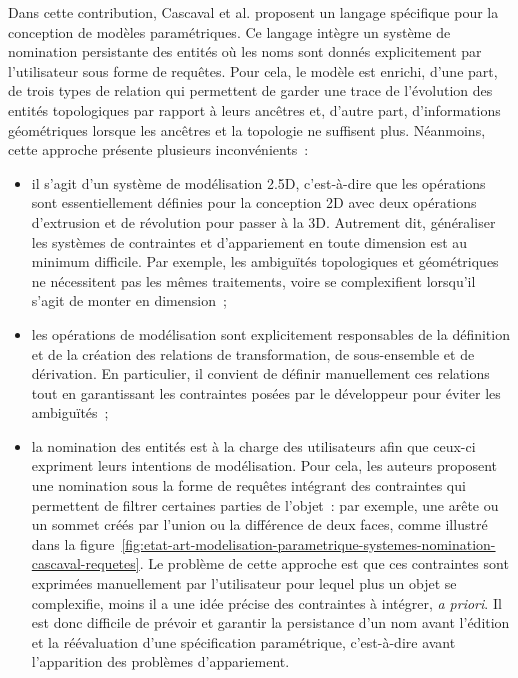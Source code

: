 
Dans cette contribution, Cascaval et al. proposent un langage spécifique pour la
conception de modèles paramétriques. %
Ce langage intègre un système de nomination persistante des entités où les noms sont donnés explicitement par l'utilisateur sous forme de requêtes. %
Pour cela, le modèle est enrichi, d'une part, de trois types de relation qui
permettent de garder une trace de l'évolution des entités topologiques par
rapport à leurs ancêtres et, d'autre part, d'informations géométriques lorsque
les ancêtres et la topologie ne suffisent plus. %
Néanmoins, cette approche présente plusieurs inconvénients~:
\begin{itemize}
	\item il s'agit d'un système de modélisation 2.5D, c'est-à-dire que les
	      opérations sont essentiellement définies pour la conception 2D avec deux
	      opérations d'extrusion et de révolution pour passer à la 3D. %
	      Autrement dit, généraliser les systèmes de contraintes et d'appariement
	      en toute dimension est au minimum difficile. Par exemple, les ambiguïtés
	      topologiques et géométriques ne nécessitent pas les mêmes traitements,
	      voire se complexifient lorsqu'il s'agit de monter en dimension~;
	\item les opérations de modélisation sont explicitement responsables de la
	      définition et de la création des relations de transformation, de
	      sous-ensemble et de dérivation. %
	      En particulier, il convient de définir manuellement ces relations tout
	      en garantissant les contraintes posées par le développeur pour éviter
	      les ambiguïtés~; %
	\item la nomination des entités est à la charge des utilisateurs afin que
	      ceux-ci expriment leurs intentions de modélisation. %
	      Pour cela, les auteurs proposent une nomination sous la forme de
	      requêtes intégrant des contraintes qui permettent de filtrer certaines
	      parties de l'objet~: %
	      par exemple, une arête ou un sommet créés par l'union ou la différence
	      de deux faces, comme illustré dans la
	      figure~\ref{fig:etat-art-modelisation-parametrique-systemes-nomination-cascaval-requetes}. %
	      Le problème de cette approche est que ces contraintes sont exprimées
	      manuellement par l'utilisateur pour lequel plus un objet se complexifie,
	      moins il a une idée précise des contraintes à intégrer, \textit{a priori}. %
	      Il est donc difficile de prévoir et garantir la persistance d'un nom avant l'édition et la
        réévaluation d'une spécification paramétrique, c'est-à-dire avant l'apparition des problèmes
        d'appariement. %
\end{itemize}


